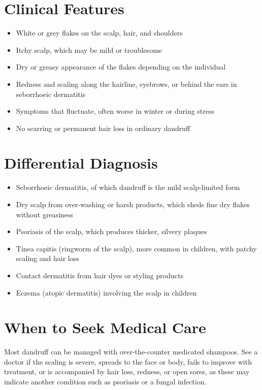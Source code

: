\section*{Clinical Features}
\begin{itemize}
    \item White or grey flakes on the scalp, hair, and shoulders
    \item Itchy scalp, which may be mild or troublesome
    \item Dry or greasy appearance of the flakes depending on the individual
    \item Redness and scaling along the hairline, eyebrows, or behind the ears in seborrhoeic dermatitis
    \item Symptoms that fluctuate, often worse in winter or during stress
    \item No scarring or permanent hair loss in ordinary dandruff
\end{itemize}

\section*{Differential Diagnosis}
\begin{itemize}
    \item Seborrhoeic dermatitis, of which dandruff is the mild scalp-limited form
    \item Dry scalp from over-washing or harsh products, which sheds fine dry flakes without greasiness
    \item Psoriasis of the scalp, which produces thicker, silvery plaques
    \item Tinea capitis (ringworm of the scalp), more common in children, with patchy scaling and hair loss
    \item Contact dermatitis from hair dyes or styling products
    \item Eczema (atopic dermatitis) involving the scalp in children
\end{itemize}

\section*{When to Seek Medical Care}
Most dandruff can be managed with over-the-counter medicated shampoos. See a doctor if the scaling is severe, spreads to the face or body, fails to improve with treatment, or is accompanied by hair loss, redness, or open sores, as these may indicate another condition such as psoriasis or a fungal infection.

